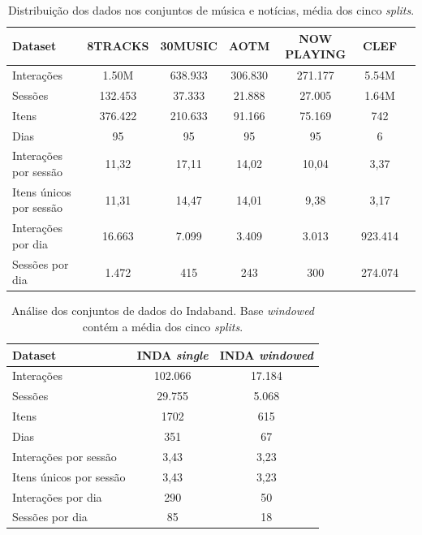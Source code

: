   \begin{table}
    \centering
    \small
    \begin{tabular}{lcccccc}
        \toprule
        \textbf{Dataset} & \textbf{8TRACKS} & \textbf{30MUSIC} & \textbf{AOTM} & \textbf{NOW PLAYING} & \textbf{CLEF} \\
        \midrule
        Interações & 1.50M & 638.933 & 306.830 & 271.177 & 5.54M \\
        Sessões & 132.453 & 37.333 & 21.888 & 27.005 & 1.64M \\
        Itens & 376.422 & 210.633 & 91.166 & 75.169 & 742 \\
        Dias & 95 & 95 & 95 & 95 & 6 \\
        \hline
        Interações por sessão & 11,32 & 17,11 & 14,02 & 10,04 & 3,37 \\
        Itens únicos por sessão & 11,31 & 14,47 & 14,01 & 9,38 & 3,17 \\
        Interações por dia & 16.663 & 7.099 & 3.409 & 3.013 & 923.414 \\
        Sessões por dia & 1.472 & 415 & 243 & 300 & 274.074 \\
        \bottomrule
    \end{tabular}
    \caption{Distribuição dos dados nos conjuntos de música e notícias, média dos cinco \textit{splits}.}
    \label{tab:datasets_comparison}
  \end{table}
  
  \begin{table}
    \centering
    \begin{tabular}{lcc}
        \toprule
        \textbf{Dataset} & \textbf{INDA \textit{single}} & \textbf{INDA \textit{windowed}}\\
        \midrule
        Interações & 102.066 & 17.184  \\
        Sessões & 29.755 & 5.068  \\
        Itens & 1702 & 615  \\
        Dias & 351 & 67  \\
        \hline
        Interações por sessão & 3,43 & 3,23 \\
        Itens únicos por sessão & 3,43 & 3,23 \\
        Interações por dia & 290 & 50 \\
        Sessões por dia & 85 & 18 \\
        \bottomrule
    \end{tabular}
    \caption{Análise dos conjuntos de dados do Indaband. Base \textit{windowed} contém a média dos cinco \textit{splits}.}
    \label{tab:datasets_including_inda}
  \end{table}
  
